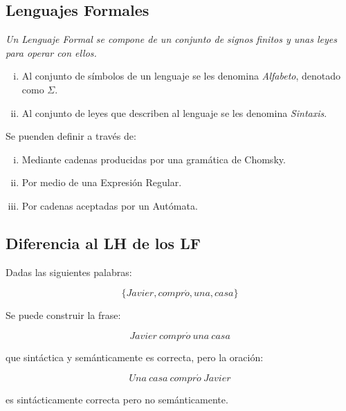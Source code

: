 \documentclass{beamer}
\theoremstyle{definition}
\theoremstyle{remark}
\begin{document}
\subsection{Lenguajes Formales}

\begin{frame}

\textit{Un Lenguaje Formal se compone de un conjunto de signos finitos y unas
leyes para operar con ellos.}
\begin{enumerate}[i.]
\item Al conjunto de símbolos de un lenguaje se les denomina \textit{Alfabeto},
denotado como $\Sigma$.

\item Al conjunto de leyes que describen al lenguaje se les denomina
\textit{Sintaxis}.
\end{enumerate}

Se puenden definir a través de:
\begin{enumerate}[i.]
\item Mediante cadenas producidas por una gramática de Chomsky. 

\item Por medio de una Expresión Regular.

\item Por cadenas aceptadas por un Autómata.

\end{enumerate}
\end{frame}

\subsection{Diferencia al LH de los LF}

\begin{frame}


Dadas las siguientes palabras: 

\begin{equation}
\{Javier,compr\acute{o},una,casa\} 
\end{equation}

Se puede construir la frase:

\begin{equation}
Javier\ compr\acute{o}\ una\ casa 
\end{equation} 

que sintáctica y semánticamente es correcta, pero la oración:

\begin{equation}
Una\ casa\ compr\acute{o}\ Javier 
\end{equation}

es sintácticamente correcta pero no semánticamente.
\end{frame}
\end{document}
